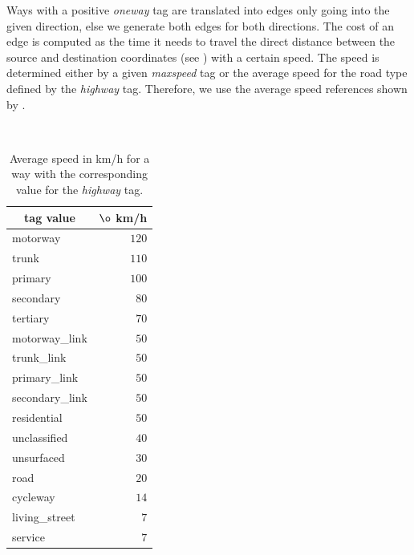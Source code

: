 	Ways with a positive \textit{oneway} tag are translated into edges only going into the given direction, else we generate
	both edges for both directions. The cost of an edge is computed as the time it needs to travel the direct distance between
	the source and destination coordinates (see ) with a certain speed. The speed is determined either
	by a given \textit{maxspeed} tag or the average speed for the road type defined by the \textit{highway} tag.
	Therefore, we use the average speed references shown by .
	\begin{table}[ht]
	 	\begin{center}
	 		\phantom{v}\quad\\
	 		\begin{tabular}{|l|r|}
	 			\hline
	 			\multicolumn{1}{|c|}{tag value}	&\multicolumn{1}{c|}{$\o$ km/h}\\\hline

				motorway		&$120$\\
				trunk			&$110$\\
				primary		&$100$\\
				secondary		&$80$\\
				tertiary		&$70$\\
				motorway\_link	&$50$\\
				trunk\_link		&$50$\\
				primary\_link		&$50$\\
				secondary\_link	&$50$\\
				residential		&$50$\\
				unclassified		&$40$\\
				unsurfaced		&$30$\\
				road			&$20$\\
				cycleway		&$14$\\
				living\_street		&$7$\\
				service		&$7$\\\hline
			\end{tabular}
		\end{center}
		\caption{Average speed in km/h for a \osm way with the corresponding value for the \textit{highway} tag.}
		\label{highwaySpeeds}
	\end{table}
